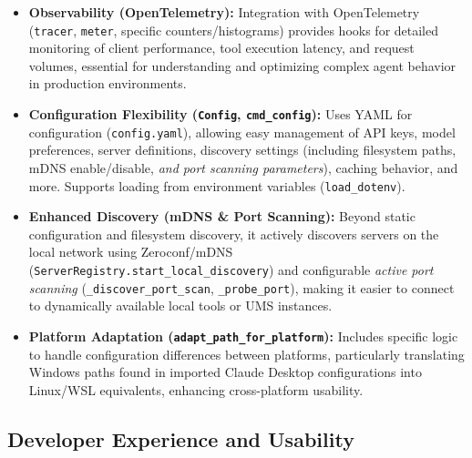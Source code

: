 \documentclass[12pt,a4paper]{article}
\newcommand{\code}[1]{\nolinkurl{#1}}
\begin{document}
\begin{itemize}
    \item \textbf{Observability (OpenTelemetry):} Integration with OpenTelemetry (\code{tracer}, \code{meter}, specific counters/histograms) provides hooks for detailed monitoring of client performance, tool execution latency, and request volumes, essential for understanding and optimizing complex agent behavior in production environments.

    \item \textbf{Configuration Flexibility (\code{Config}, \code{cmd\_config}):} Uses YAML for configuration (\code{config.yaml}), allowing easy management of API keys, model preferences, server definitions, discovery settings (including filesystem paths, mDNS enable/disable, \textit{and port scanning parameters}), caching behavior, and more. Supports loading from environment variables (\code{load\_dotenv}).

    \item \textbf{Enhanced Discovery (mDNS \& Port Scanning):} Beyond static configuration and filesystem discovery, it actively discovers servers on the local network using Zeroconf/mDNS (\code{ServerRegistry.start\_local\_discovery}) and configurable \textit{active port scanning} (\code{\_discover\_port\_scan}, \code{\_probe\_port}), making it easier to connect to dynamically available local tools or UMS instances.

    \item \textbf{Platform Adaptation (\code{adapt\_path\_for\_platform}):} Includes specific logic to handle configuration differences between platforms, particularly translating Windows paths found in imported Claude Desktop configurations into Linux/WSL equivalents, enhancing cross-platform usability.
\end{itemize}

\subsection{Developer Experience and Usability}
\end{document}
